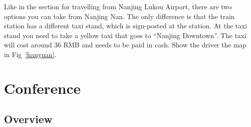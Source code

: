 \documentclass[11pt]{report}
\begin{document}
Like in the section for travelling from Nanjing Lukou Airport,
there are two options you can take from Nanjing Nan. The only
difference is that the train station has a different taxi
stand, which is sign-posted at the station. At the taxi stand
you need to take a yellow taxi that goes to ``Nanjing
Downtown''. The taxi will cost around 36 RMB and needs to be
paid in cash. Show the driver the map in Fig~\ref{hanyuan}.


\chapter{Conference}

\section*{Overview}
\end{document}
